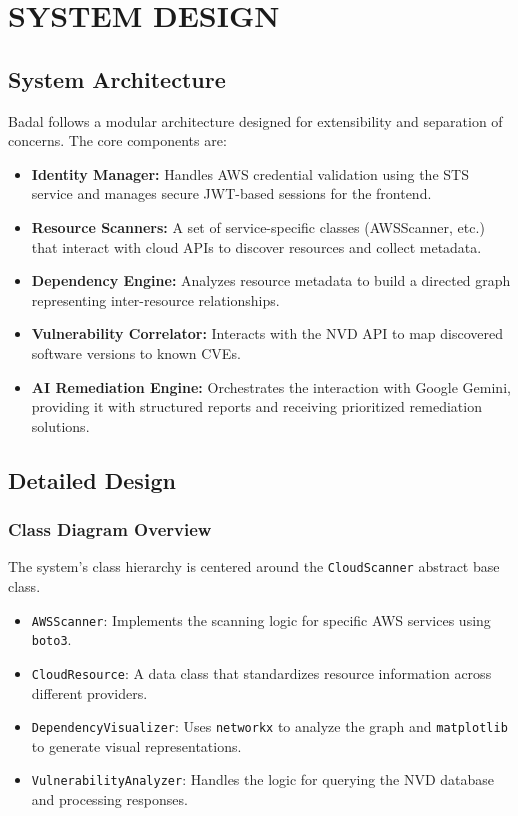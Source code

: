 \chapter{\MakeUppercase{System Design}}

\section{System Architecture}
Badal follows a modular architecture designed for extensibility and separation of concerns. The core components are:

\begin{itemize}
    \item \textbf{Identity Manager:} Handles AWS credential validation using the STS service and manages secure JWT-based sessions for the frontend.
    \item \textbf{Resource Scanners:} A set of service-specific classes (AWSScanner, etc.) that interact with cloud APIs to discover resources and collect metadata.
    \item \textbf{Dependency Engine:} Analyzes resource metadata to build a directed graph representing inter-resource relationships.
    \item \textbf{Vulnerability Correlator:} Interacts with the NVD API to map discovered software versions to known CVEs.
    \item \textbf{AI Remediation Engine:} Orchestrates the interaction with Google Gemini, providing it with structured reports and receiving prioritized remediation solutions.
\end{itemize}

\section{Detailed Design}
\subsection{Class Diagram Overview}
The system's class hierarchy is centered around the \texttt{CloudScanner} abstract base class.
\begin{itemize}
    \item \texttt{AWSScanner}: Implements the scanning logic for specific AWS services using \texttt{boto3}.
    \item \texttt{CloudResource}: A data class that standardizes resource information across different providers.
    \item \texttt{DependencyVisualizer}: Uses \texttt{networkx} to analyze the graph and \texttt{matplotlib} to generate visual representations.
    \item \texttt{VulnerabilityAnalyzer}: Handles the logic for querying the NVD database and processing responses.
\end{itemize}

